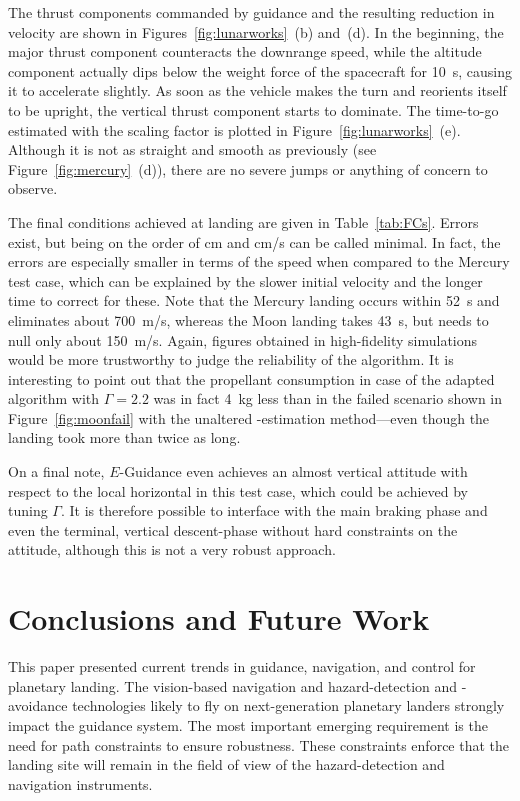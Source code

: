 \documentclass[%
]{aiaa-tc}
\begin{document}
The thrust components commanded by guidance and the resulting reduction in
velocity are shown in Figures~\ref{fig:lunarworks}~(b) and~(d). In the
beginning, the major thrust component counteracts the downrange speed, while the
altitude component actually dips below the weight force of the spacecraft for
\SI{10}{s}, causing it to accelerate slightly. As soon as the vehicle makes the
turn and reorients itself to be upright, the vertical thrust component starts to
dominate. The time-to-go estimated with the scaling factor is plotted in
Figure~\ref{fig:lunarworks}~(e). Although it is not as straight and smooth as
previously (see Figure~\ref{fig:mercury}~(d)), there are no severe jumps
or anything of concern to observe.

The final conditions achieved at landing are given in Table~\ref{tab:FCs}.
Errors exist, but being on the order of cm and cm/s can be called minimal. In
fact, the errors are especially smaller in terms of the speed when compared to
the Mercury test case, which can be explained by the slower initial velocity and
the longer time to correct for these. Note that the Mercury landing occurs
within \SI{52}{s} and eliminates about \SI{700}{m/s}, whereas the Moon landing
takes \SI{43}{s}, but needs to null only about \SI{150}{m/s}. Again, figures
obtained in high-fidelity simulations would be more trustworthy to judge the
reliability of the algorithm. It is interesting to point out that the propellant
consumption in case of the adapted algorithm with $\Gamma = 2.2$ was in fact
\SI{4}{kg} less than in the failed scenario shown in Figure~\ref{fig:moonfail}
with the unaltered \tgo-estimation method---even though the landing took more
than twice as long.

On a final note, $E$-Guidance even achieves an almost vertical attitude with
respect to the local horizontal in this test case, which could be achieved by
tuning $\Gamma$. It is therefore possible to interface with the main braking
phase and even the terminal, vertical descent-phase without hard constraints on
the attitude, although this is not a very robust approach.

\section{Conclusions and Future Work}

This paper presented current trends in guidance, navigation, and control for
planetary landing. The vision-based navigation and hazard-detection and
-avoidance technologies likely to fly on next-generation planetary landers
strongly impact the guidance system. The most important emerging requirement is
the need for path constraints to ensure robustness. These constraints enforce
that the landing site will remain in the field of view of the hazard-detection
and navigation instruments.
\end{document}
